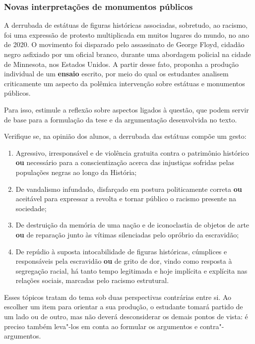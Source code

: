 \documentclass[12pt]{extarticle}
\begin{document}
\subsubsection{Novas interpretações de monumentos públicos}

A derrubada de estátuas de figuras históricas associadas, sobretudo,
ao racismo, foi uma expressão de protesto multiplicada em muitos
lugares do mundo, no ano de 2020. O movimento foi disparado pelo
assassinato de George Floyd, cidadão negro asfixiado por um oficial
branco, durante uma abordagem policial na cidade de Minnesota, nos
Estados Unidos. A partir desse fato, proponha a produção individual de
um \textbf{ensaio} escrito, por meio do qual os estudantes analisem
criticamente um aspecto da polêmica intervenção sobre estátuas e
monumentos públicos. 


Para isso, estimule a reflexão sobre aspectos
ligados à questão, que podem servir de base para a formulação da tese
e da argumentação desenvolvida no texto.

Verifique se, na opinião dos alunos, a derrubada das estátuas compõe um
gesto: 

\begin{enumerate}
\item Agressivo, irresponsável e de violência gratuita contra o
patrimônio histórico \textbf{ou} necessário para a conscientização acerca
das injustiças sofridas pelas populações negras ao longo da História;
\item De vandalismo infundado, disfarçado em postura politicamente correta
\textbf{ou} aceitável para expressar a revolta e tornar público o racismo
presente na sociedade; 
\item De destruição da memória de uma nação e de
iconoclastia de objetos de arte \textbf{ou} de reparação junto às vítimas
silenciadas pelo opróbrio da escravidão; 
\item De repúdio à suposta
intocabilidade de figuras históricas, cúmplices e responsáveis pela
escravidão \textbf{ou} de grito de dor, vindo como resposta à segregação
racial, há tanto tempo legitimada e hoje implícita e explícita nas
relações sociais, marcadas pelo racismo estrutural.
\end{enumerate}

Esses tópicos tratam do tema sob duas perspectivas contrárias entre si.
Ao escolher um item para orientar a sua produção, o estudante tomará
partido de um lado ou de outro, mas não deverá desconsiderar os demais
pontos de vista: é preciso também leva"-los em conta ao formular os
argumentos e contra"-argumentos.
\end{document}
